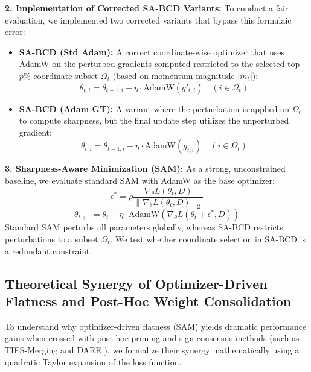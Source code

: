 \textbf{2. Implementation of Corrected SA-BCD Variants:} To conduct a fair evaluation, we implemented two corrected variants that bypass this formulaic error:
\begin{itemize}
  \item \textbf{SA-BCD (Std Adam):} A correct coordinate-wise optimizer that uses AdamW on the perturbed gradients computed restricted to the selected top-$p\%$ coordinate subset $\Omega_t$ (based on momentum magnitude $|m_t|$):
    \begin{equation}
      \theta_{t, i} = \theta_{t-1, i} - \eta \cdot \text{AdamW}(g'_{t, i}) \quad (i \in \Omega_t)
    \end{equation}
  \item \textbf{SA-BCD (Adam GT):} A variant where the perturbation is applied on $\Omega_t$ to compute sharpness, but the final update step utilizes the unperturbed gradient:
    \begin{equation}
      \theta_{t, i} = \theta_{t-1, i} - \eta \cdot \text{AdamW}(g_{t, i}) \quad (i \in \Omega_t)
    \end{equation}
\end{itemize}

\textbf{3. Sharpness-Aware Minimization (SAM):} As a strong, unconstrained baseline, we evaluate standard SAM \cite{sam} with AdamW as the base optimizer:
\begin{equation}
  \epsilon^* = \rho \frac{\nabla_\theta L(\theta_t, D)}{\|\nabla_\theta L(\theta_t, D)\|_2}
\end{equation}
\begin{equation}
  \theta_{t+1} = \theta_t - \eta \cdot \text{AdamW}(\nabla_\theta L(\theta_t + \epsilon^*, D))
\end{equation}
Standard SAM perturbs all parameters globally, whereas SA-BCD restricts perturbations to a subset $\Omega_t$. We test whether coordinate selection in SA-BCD is a redundant constraint.

\subsection{Theoretical Synergy of Optimizer-Driven Flatness and Post-Hoc Weight Consolidation}
\label{sec:theoretical_synergy}

To understand why optimizer-driven flatness (SAM) yields dramatic performance gains when crossed with post-hoc pruning and sign-consensus methods (such as TIES-Merging \cite{tiesmerging} and DARE \cite{dare}), we formalize their synergy mathematically using a quadratic Taylor expansion of the loss function.


